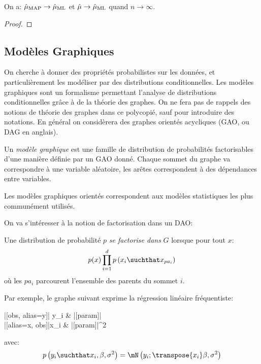 \documentclass[info, math, french]{mpb-cours}
\def\model#1#2{p\left(#1\suchthat#2\right)}
\def\define#1{\emph{\textcolor{vulm}{#1}}}
\def\plate#1#2#3{%
    \node[anchor=north east, yshift=-.1cm] (text) at (#2.south east) {#3};
  \begin{pgfonlayer}{bg}
    \draw[rounded corners, draw, fill=gray!1] let 
      \p1 = (text.south west),
      \p2 = (#2.south west),
      \p3 = (#1.north west),
      \p4 = (#1.north east),
      \p5 = (text.south east) in
      ({min(\x1, \x2, \x3, (\x4 - 1.3 * (width("#3")))) - \platepadding}, \y1) rectangle ({max(\x4, \x5) + \platepadding}, \y4 + \platepadding);
  \end{pgfonlayer}
}
\newcommand{\gmnode}[1]{%
    |[#1]|
}
\newenvironment{gmodel}[1]{
  \begin{category}[/tikz/execute at end picture={#1}]
}{
\end{category}
}
\begin{document}
\begin{proposition}
	On a: $\hat{\mu}_{\rm MAP} \to \hat{\mu}_{\rm ML}$ et $\hat{\mu} \to \hat{\mu}_{\rm ML}$ quand $n \to \infty$.
\end{proposition}
\begin{proof}

\end{proof}

\subsection{Modèles Graphiques}
On cherche à donner des propriétés probabilistes sur les données, et particulièrement les modéliser par des distributions conditionnelles.
Les modèles graphiques sont un formalisme permettant l'analyse de distributions conditionnelles grâce à de la théorie des graphes.
On ne fera pas de rappels des notions de théorie des graphes dans ce polycopié, sauf pour introduire des notations. En général on considèrera des graphes orientés acycliques (GAO, ou DAG en anglais).

\begin{definition}
	Un \define{modèle graphique} est une famille de distribution de probabilités factorisables d'une manière définie par un GAO donné.
	Chaque sommet du graphe va correspondre à une variable aléatoire, les arêtes correspondent à des dépendances entre variables.
\end{definition}
Les modèles graphiques orientés correspondent aux modèles statistiques les plus communément utilisés.

On va s'intéresser à la notion de factorisation dans un DAO:
\begin{definition}
	Une distribution de probabilité $p$ \define{se factorise dans} $G$ lorsque pour tout $x$:
	\begin{equation*}
		p(x) \prod_{i = 1}^{d}\model{x_{i}}{x_{pa_{i}}}
	\end{equation*}
	où les $pa_{i}$ parcourent l'ensemble des parents du sommet $i$.
\end{definition}

Par exemple, le graphe suivant exprime la régression linéaire fréquentiste:
\begin{gmodel}{\plate{y}{x}{$\forall i \leq n$}}
	\gmnode{obs, alias=y}y_{i} & |[param]|\beta\ar[l]\\
	|[alias=x, obs]|x_{i} \ar[u] &  |[param]|\sigma^{2} \ar[ul]
\end{gmodel}
avec:
\begin{equation*}
	\model{y_{i}}{x_{i}, \beta, \sigma^{2}} = \mN\left(y_{i}; \transpose{x_{i}}\beta, \sigma^{2}\right)
\end{equation*}
\end{document}
